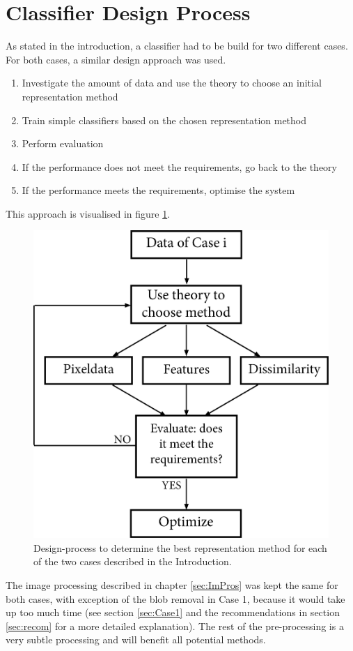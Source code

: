 \section{Classifier Design Process}
\label{sec:ClasDes}
As stated in the introduction, a classifier had to be build for two different cases. For both cases, a similar design approach was used. \begin{enumerate}
	\item Investigate the amount of data and use the theory to choose an initial representation method
	\item Train simple classifiers based on the chosen representation method
	\item Perform evaluation
	\item If the performance does not meet the requirements, go back to the theory
	\item If the performance meets the requirements, optimise the system
\end{enumerate}
This approach is visualised in figure \ref{fig:case_design}.
\begin{figure}[H]
	\centering
	\includegraphics[scale=0.55]{images/Case_Design.jpg}
	\caption{Design-process to determine the best representation method for each of the two cases described in the Introduction.}
	\label{fig:case_design}
\end{figure}
\noindent The image processing described in chapter \ref{sec:ImPros} was kept the same for both cases, with exception of the blob removal in Case 1, because it would take up too much time (see section \ref{sec:Case1} and the recommendations in section \ref{sec:recom} for a more detailed explanation).   The rest of the pre-processing is a very subtle processing and will benefit all potential methods.

